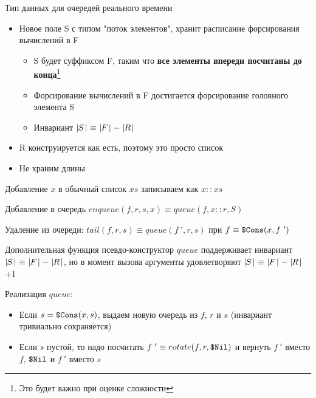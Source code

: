 \def\invariant{$\card{S}\ \equiv\ \card{F}-\card{R}$}
\def\rotate{\ensuremath{rotate}}

\begin{frame}{Тип данных для очередей реального времени}
\begin{itemize}
\item Новое поле S с типом "поток элементов", хранит расписание форсирования вычислений в F
\begin{itemize}
\item S будет суффиксом F, таким что \textbf{все элементы впереди посчитаны до конца}\footnote{Это будет важно при оценке сложности}
\item Форсирование вычислений в F достигается форсирование головного элемента S
\item Инвариант \invariant
\end{itemize}
\item R конструируется как есть, поэтому это просто список
\item Не храним длины 
\end{itemize}
\end{frame}

\begin{frame}
\begin{notation}
Добавление $x$ в обычный список $xs$ записываем как $x::xs$
\end{notation}
Добавление в очередь $enqueue(f,r,s,x) \equiv queue(f, x::r, S) $

Удаление из очереди: $tail(f,r,s) \equiv queue(f\ ',r,s)$ при $f\equiv\texttt{\$Cons}(x,f\ ')$
\vspace{1em}

Дополнительная функция псевдо-конструктор $queue$ поддерживает инвариант \invariant, но в момент вызова аргументы удовлетворяют \invariant+1
\vspace{1em}

Реализация $queue$:
\begin{itemize}
\item Если $s=\texttt{\$Cons}(x,s)$, выдаем новую очередь из $f$, $r$ и $s$ (инвариант тривиально сохраняется)
\item Если $s$ пустой, то надо посчитать $f\ ' \equiv rotate(f,r,\texttt{\$Nil})$ и вернуть $f\ '$ вместо $f$, $\texttt{\$Nil}$ и $f\ '$ вместо $s$
\end{itemize}
\end{frame}

